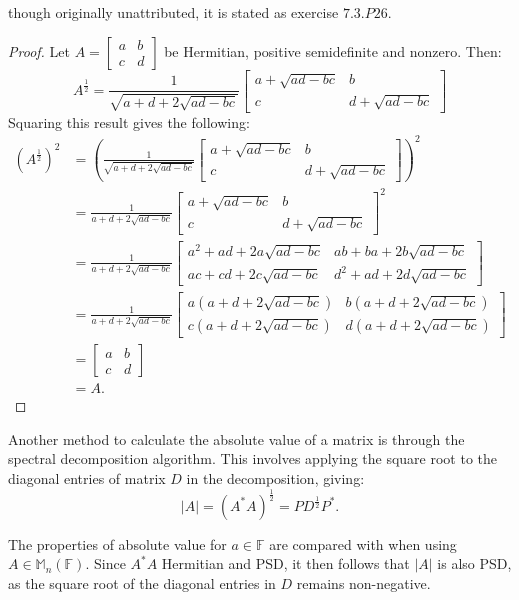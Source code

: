 though originally unattributed, it is stated as exercise $7.3.P26$.
\begin{proof}
    Let $A =
    \begin{bmatrix}
        a & b \\
        c & d
    \end{bmatrix}$
    be Hermitian, positive semidefinite and nonzero. Then:
    $$
    A^{\frac{1}{2}} = \frac{1}{\sqrt{ a + d + 2\sqrt{ad - bc}}}
    \begin{bmatrix}
        a + \sqrt{ad-bc} & b\\
        c & d + \sqrt{ad-bc}
    \end{bmatrix}
    $$
    Squaring this result gives the following:
    \begin{align*}
        \left(A^{\frac{1}{2}}\right)^2 &= \left(\frac{1}{\sqrt{ a + d + 2\sqrt{ad - bc}}}
    \begin{bmatrix}
        a + \sqrt{ad-bc} & b\\
        c & d + \sqrt{ad-bc}
    \end{bmatrix} \right)^2\\
    &=
    \frac{1}{ a + d + 2\sqrt{ad - bc} }
    \begin{bmatrix}
        a + \sqrt{ad-bc} & b\\
        c & d + \sqrt{ad-bc}
    \end{bmatrix}^2\\
    &=
    \frac{1}{ a + d + 2\sqrt{ad - bc} }
    \begin{bmatrix}
        a^2 + ad +2a\sqrt{ad-bc} & ab +ba + 2b\sqrt{ad-bc} \\
        ac + cd + 2c\sqrt{ad-bc} & d^2 +ad +2d\sqrt{ad-bc}
    \end{bmatrix} \\ 
    &= 
    \frac{1}{ a + d + 2\sqrt{ad - bc} }
    \begin{bmatrix}
        a(a + d +2\sqrt{ad-bc}) & b(a +d + 2\sqrt{ad-bc}) \\
        c(a + d + 2\sqrt{ad-bc}) & d(a +d +2\sqrt{ad-bc})
    \end{bmatrix} \\ 
    &= 
    \begin{bmatrix}
        a &b\\
        c & d
    \end{bmatrix}\\
    &= A.
    \end{align*}
\end{proof}
Another method to calculate the absolute value of a matrix is through the spectral decomposition algorithm. This involves applying the square root to the diagonal entries of matrix \(D\) in the decomposition, giving:
$$
|A| = \left(A^*A\right)^\frac{1}{2} = PD^\frac{1}{2}P^*.
$$
\par The properties of absolute value for $a \in \mathbb{F}$ are compared with when using $A \in \mathbb{M}_n(\mathbb{F})$.
Since $A^*A$ Hermitian and PSD, it then follows that $|A|$ is also PSD, as the square root of the diagonal entries in \(D\) remains non-negative.

